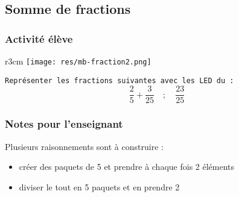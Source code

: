 %
%
\newpage
\subsection{Somme de fractions}
\subsubsection{Activité élève}


%
%
\begin{wrapfigure}[4]{r}{3cm}
    \texttt{[image: res/mb-fraction2.png]}
\end{wrapfigure}

\begin{eleve}    
    \texttt{Représenter les fractions suivantes avec les LED du \mb :}
    $$
    \frac{2}{5} + \frac{3}{25} \quad ; \quad \frac{23}{25}
    $$
\end{eleve}

%
%
\subsubsection{Notes pour l'enseignant}

\begin{remarque}
Plusieurs raisonnements sont à construire :
\begin{itemize}
    \item créer des paquets de 5 et prendre à chaque fois 2 éléments 
    \item diviser le tout en 5 paquets et en prendre 2
    
\end{itemize}
    
\end{remarque}